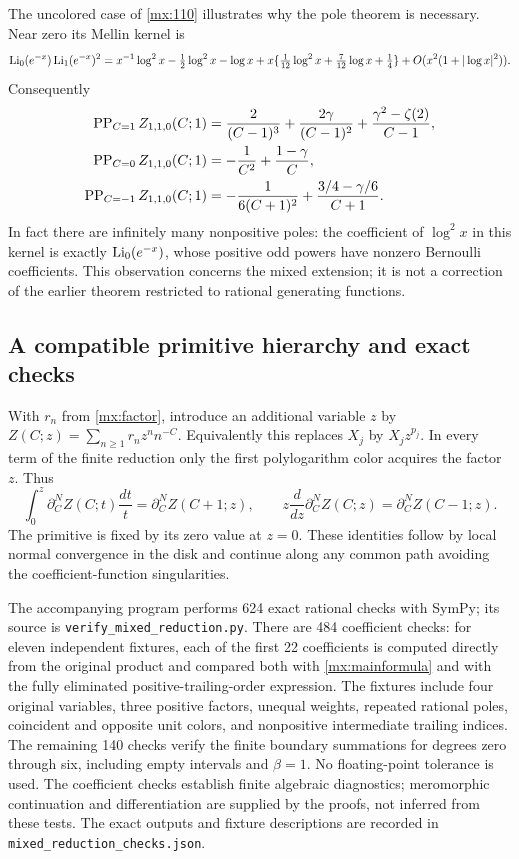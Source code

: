 The uncolored case of \eqref{mx:110} illustrates why the pole theorem
is necessary.  Near zero its Mellin kernel is
\[
 \operatorname{Li}_0(e^{-x})\operatorname{Li}_1(e^{-x})^2
 =x^{-1}\log^2x-\tfrac12\log^2x-\log x
   +x\{\tfrac1{12}\log^2x+\tfrac7{12}\log x+\tfrac14\}
   +O(x^2(1+|\log x|^2)).
\]
Consequently
\begin{align}\label{mx:examplepoles}
 \operatorname{PP}_{C=1} Z_{1,1,0}(C;1)
  &=\frac2{(C-1)^3}+\frac{2\gamma}{(C-1)^2}
                         +\frac{\gamma^2-\zeta(2)}{C-1},\notag\\
 \operatorname{PP}_{C=0} Z_{1,1,0}(C;1)
  &=-\frac1{C^2}+\frac{1-\gamma}{C},\notag\\
 \operatorname{PP}_{C=-1} Z_{1,1,0}(C;1)
  &=-\frac1{6(C+1)^2}+\frac{3/4-\gamma/6}{C+1}.
\end{align}
In fact there are infinitely many nonpositive poles: the coefficient
of $\log^2x$ in this kernel is exactly
$\operatorname{Li}_0(e^{-x})$, whose positive odd powers have nonzero Bernoulli
coefficients.  This observation concerns the mixed extension; it is
not a correction of the earlier theorem restricted to rational
generating functions.

\subsection{A compatible primitive hierarchy and exact checks}

With $r_n$ from \eqref{mx:factor}, introduce an additional variable
$z$ by $Z(C;z)=\sum_{n\geq1}r_nz^nn^{-C}$.  Equivalently this
replaces $X_j$ by $X_jz^{p_j}$.  In every term of the finite reduction
only the first polylogarithm color acquires the factor $z$.  Thus
\begin{equation}\label{mx:primitives}
 \int_0^z\partial_C^N Z(C;t)\frac{dt}{t}
        =\partial_C^N Z(C+1;z),\qquad
 z\frac d{dz}\partial_C^N Z(C;z)
        =\partial_C^N Z(C-1;z).
\end{equation}
The primitive is fixed by its zero value at $z=0$.  These identities
follow by local normal convergence in the disk and continue along
any common path avoiding the coefficient-function singularities.

The accompanying program performs 624 exact rational checks with
SymPy; its source is \texttt{verify\_mixed\_reduction.py}.
There are 484 coefficient
checks: for eleven independent fixtures, each of the first 22
coefficients is computed directly from the original product and
compared both with \eqref{mx:mainformula} and with the fully eliminated
positive-trailing-order expression.  The fixtures include four
original variables, three positive factors, unequal weights, repeated
rational poles, coincident and opposite unit colors, and nonpositive
intermediate trailing indices.  The remaining 140 checks verify the
finite boundary summations for degrees zero through six, including
empty intervals and $\beta=1$.  No floating-point tolerance is used.
The coefficient checks establish finite algebraic diagnostics;
meromorphic continuation and differentiation are supplied by the
proofs, not inferred from these tests.  The exact outputs and fixture
descriptions are recorded in \texttt{mixed\_reduction\_checks.json}.

